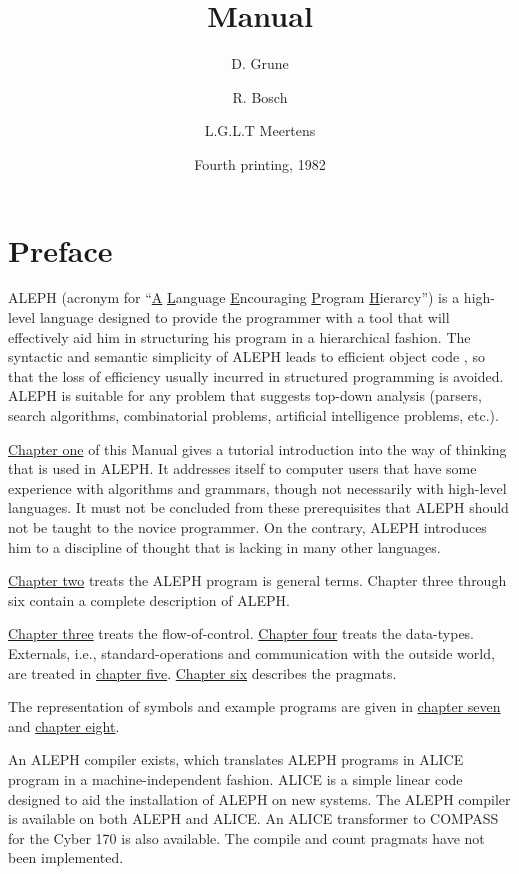 \documentclass{article}
\title{{\A} Manual}
\author{D. Grune \and R. Bosch \and L.G.L.T Meertens}
\date{Fourth printing, 1982}
\newcommand\g[1]{{\sf #1}}
\newcommand\A{{\sf ALEPH}}
\begin{document}
\maketitle

\setcounter{section}{-1}
\section{Preface}
{\A} (acronym for ``\underline{\sf A} \underline{\sf L}anguage
\underline{\sf E}ncouraging \underline{\sf P}rogram \underline{\sf
H}ierarcy'') is a high-level language designed to provide the programmer
with a tool that will effectively aid him in structuring his program in a
hierarchical fashion. The syntactic and semantic simplicity of {\A} leads to
efficient object code \cite{wichmann77}, so that the loss
of efficiency usually incurred in structured programming is avoided. {\A} is
suitable for any problem that suggests top-down analysis (parsers, search
algorithms, combinatorial problems, artificial intelligence problems, etc.).

\hyperref[1]{Chapter one} of this Manual gives a tutorial introduction into the way of
thinking that is used in \A. It addresses itself to computer users that have
some experience with algorithms and grammars, though not necessarily with
high-level languages. It must not be concluded from these prerequisites
that \A{} should not be taught to the novice programmer. On the contrary,
\A{} introduces him to a discipline of thought that is lacking in many other
languages.

\hyperref[sec:2]{Chapter two} treats the \A{} program is general terms. Chapter three through
six contain a complete description of \A.

\hyperref[sec:3]{Chapter three} treats the flow-of-control.
\hyperref[sec:4]{Chapter four} treats the data-types.
Externals, i.e., standard-operations and communication with the outside
world, are treated in \hyperref[sec:5]{chapter five}. \hyperref[sec:6]{Chapter
six} describes the pragmats.

The representation of \g{symbols} and example programs are given in
\hyperref[sec:7]{chapter seven} and \hyperref[sec:8]{chapter eight}.

An \A{} compiler exists, which translates \A{} programs in {\sf ALICE}
program in a machine-independent fashion. {\sf ALICE}\cite{bohm77} is a
simple linear code designed to aid the installation of \A{} on new systems.
The \A{} compiler is available on both \A{} and {\sf ALICE}. An {\sf ALICE}
transformer to {\sf COMPASS} for the Cyber 170 is also available. The
\g{compile} and \g{count} pragmats have not been implemented.
\end{document}
